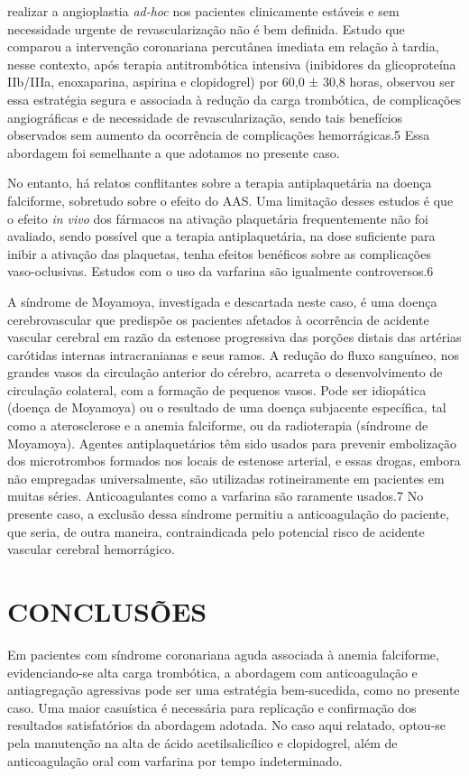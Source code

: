 realizar a angioplastia \textit{ad-hoc} nos pacientes clinicamente estáveis e sem necessidade urgente de revascularização não é bem definida. Estudo que comparou a intervenção coronariana percutânea imediata em relação à tardia, nesse contexto, após terapia antitrombótica intensiva (inibidores da glicoproteína IIb/IIIa, enoxaparina, aspirina e clopidogrel) por 60,0 ± 30,8 horas, observou ser essa estratégia segura e associada à redução da carga trombótica, de complicações angiográficas e de necessidade de revascularização, sendo tais benefícios observados sem aumento da ocorrência de complicações hemorrágicas.5 Essa abordagem foi semelhante a que adotamos no presente caso.\par No entanto, há relatos conflitantes sobre a terapia antiplaquetária na doença falciforme, sobretudo sobre o efeito do AAS. Uma limitação desses estudos é que o efeito \textit{in vivo} dos fármacos na ativação plaquetária frequentemente não foi avaliado, sendo possível que a terapia antiplaquetária, na dose suficiente para inibir a ativação das plaquetas, tenha efeitos benéficos sobre as complicações vaso-oclusivas. Estudos com o uso da varfarina são igualmente controversos.6\par A síndrome de Moyamoya, investigada e descartada neste caso, é uma doença cerebrovascular que predispõe os pacientes afetados à ocorrência de acidente vascular cerebral em razão da estenose progressiva das porções distais das artérias carótidas internas intracranianas e seus ramos. A redução do fluxo sanguíneo, nos grandes vasos da circulação anterior do cérebro, acarreta o desenvolvimento de circulação colateral, com a formação de pequenos vasos. Pode ser idiopática (doença de Moyamoya) ou o resultado de uma doença subjacente específica, tal como a aterosclerose e a anemia falciforme, ou da radioterapia (síndrome de Moyamoya). Agentes antiplaquetários têm sido usados para prevenir embolização dos microtrombos formados nos locais de estenose arterial, e essas drogas, embora não empregadas universalmente, são utilizadas rotineiramente em pacientes em muitas séries. Anticoagulantes como a varfarina são raramente usados.7 No presente caso, a exclusão dessa síndrome permitiu a anticoagulação do paciente, que seria, de outra maneira, contraindicada pelo potencial risco de acidente vascular cerebral hemorrágico.\section*{CONCLUSÕES}\par Em pacientes com síndrome coronariana aguda associada à anemia falciforme, evidenciando-se alta carga trombótica, a abordagem com anticoagulação e antiagregação agressivas pode ser uma estratégia bem-sucedida, como no presente caso. Uma maior casuística é necessária para replicação e confirmação dos resultados satisfatórios da abordagem adotada. No caso aqui relatado, optou-se pela manutenção na alta de ácido acetilsalicílico e clopidogrel, além de anticoagulação oral com varfarina por tempo indeterminado.